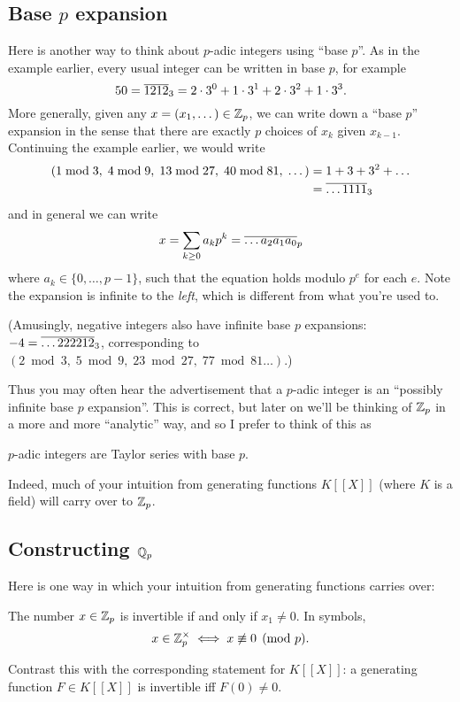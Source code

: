 \subsection{Base $p$ expansion}
Here is another way to think about $p$-adic integers using ``base $p$''.
As in the example earlier, every usual integer can be written in base $p$,
for example
\[ 50 = \overline{1212}_3 = 2 \cdot 3^0 + 1 \cdot 3^1 + 2 \cdot 3^2 + 1 \cdot 3^3. \]
More generally, given any $x = (x_1, \dots) \in \mathbb Z_p$,
we can write down a ``base $p$'' expansion in the sense
that there are exactly $p$ choices of $x_k$ given $x_{k-1}$.
Continuing the example earlier, we would write
\begin{align*}
	\left( 1 \bmod 3, \; 4 \bmod 9, \;
	13 \bmod{27}, \; 40 \bmod{81}, \; \dots \right)
	&= 1 + 3 + 3^2 + \dots \\
	&= \overline{\dots1111}_3
\end{align*}
and in general we can write
\[ x = \sum_{k \ge 0} a_k p^k = \overline{\dots a_2 a_1 a_0}_p \]
where $a_k \in \{0, \dots, p-1\}$,
such that the equation holds modulo $p^e$ for each $e$.
Note the expansion is infinite to the \emph{left},
which is different from what you're used to.

(Amusingly, negative integers also have infinite base $p$ expansions:
$-4 = \overline{\dots222212}_3$, corresponding to
$(2 \bmod 3, \; 5 \bmod 9, \; 23 \bmod{27}, \; 77 \bmod{81} \dots)$.)

Thus you may often hear the advertisement that a $p$-adic integer
is an ``possibly infinite base $p$ expansion''.
This is correct, but later on we'll be thinking of $\mathbb Z_p$ in
a more and more ``analytic'' way,
and so I prefer to think of this as
\begin{moral}
	$p$-adic integers are Taylor series with base $p$.
\end{moral}
Indeed, much of your intuition from generating functions $K[[X]]$
(where $K$ is a field) will carry over to $\mathbb Z_p$.

\subsection{Constructing $\mathbb Q_p$}
Here is one way in which your intuition from generating functions carries over:
\begin{proposition}
	The number $x \in \mathbb Z_p$ is invertible if and only if $x_1 \ne 0$.
	In symbols,
	\[ x \in \mathbb Z_p^\times \iff x \not\equiv 0 \pmod p. \]
\end{proposition}
Contrast this with the corresponding statement for $K[ [ X ] ]$:
a generating function $F \in K[ [ X ] ]$ is invertible iff $F(0) \neq 0$.

